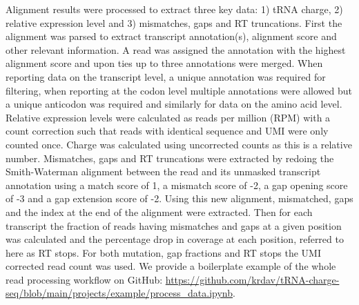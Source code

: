 \documentclass[9pt,lineno]{elife}
\begin{document}
Alignment results were processed to extract three key data: 1) tRNA charge, 2) relative expression level and 3) mismatches, gaps and RT truncations.
First the alignment was parsed to extract transcript annotation(s), alignment score and other relevant information.
A read was assigned the annotation with the highest alignment score and upon ties up to three annotations were merged.
When reporting data on the transcript level, a unique annotation was required for filtering, when reporting at the codon level multiple annotations were allowed but a unique anticodon was required and similarly for data on the amino acid level.
Relative expression levels were calculated as reads per million (RPM) with a count correction such that reads with identical sequence and UMI were only counted once.
Charge was calculated using uncorrected counts as this is a relative number.
Mismatches, gaps and RT truncations were extracted by redoing the Smith-Waterman alignment between the read and its unmasked transcript annotation using a match score of 1, a mismatch score of -2, a gap opening score of -3 and a gap extension score of -2.
Using this new alignment, mismatched, gaps and the index at the end of the alignment were extracted.
Then for each transcript the fraction of reads having mismatches and gaps at a given position was calculated and the percentage drop in coverage at each position, referred to here as RT stops.
For both mutation, gap fractions and RT stops the UMI corrected read count was used.
We provide a boilerplate example of the whole read processing workflow on GitHub: \url{https://github.com/krdav/tRNA-charge-seq/blob/main/projects/example/process_data.ipynb}.
\end{document}
